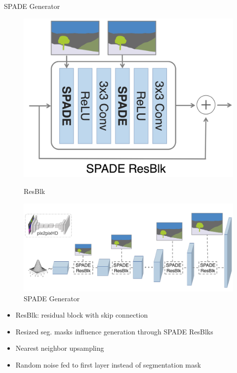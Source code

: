\documentclass{beamer}
\begin{document}

\begin{frame}{SPADE Generator}
    \begin{figure}
        \begin{minipage}[b]{0.25\linewidth}
            \centering
            \includegraphics[width=\textwidth]{figures/spade_resblk.png}
            \caption{ResBlk}
        \end{minipage}
        \hspace{0.5cm}
        \begin{minipage}[b]{0.6\linewidth}
            \centering
            \includegraphics[width=\textwidth]{figures/spade_generator.png}
            \caption{SPADE Generator}
        \end{minipage}
    \end{figure}
    
    \begin{itemize}[<+->]
        \item ResBlk: residual block with skip connection
        \item Resized seg. masks influence generation through SPADE ResBlks
        \item Nearest neighbor upsampling
        \item Random noise fed to first layer instead of segmentation mask
    \end{itemize}
\end{frame}
\end{document}
